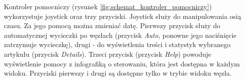 
Kontroler pomocniczy (rysunek \ref{fig:schemat_kontroler_pomocniczy}) wykorzystuje joystick oraz trzy przyciski. Joystick służy do manipulowania osią czasu. Za jego pomocą można zmieniać datę. Pierwszy przycisk służy do automatycznej wycieczki po węzłach (przycisk \textit{Auto}, ponowne jego naciśnięcie zatrzymuje wycieczkę), drugi - do wyświetlenia treści i statystyk wybranego artykułu (przycisk \textit{Details}). Trzeci przycisk (przycisk \textit{Help}) powoduje wyświetlenie pomocy z infografiką o sterowaniu, która jest dostępna w każdym widoku. Przyciski pierwszy i drugi są dostępne tylko w trybie widoku węzła.

